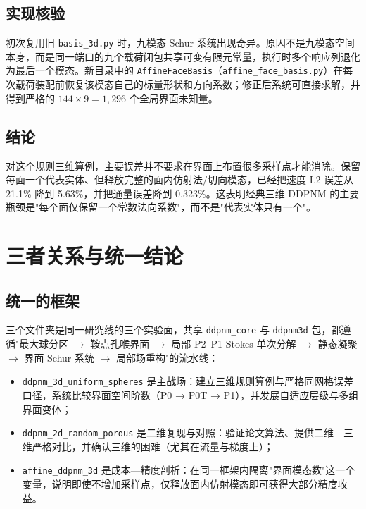 \documentclass[11pt,a4paper]{ctexart}
\newcommand{\Dd}{DDPNM}
\begin{document}
\subsection{实现核验}
\label{sec:affine-validation}

初次复用旧 \texttt{basis\_3d.py} 时，九模态 Schur 系统出现奇异。原因不是九模态空间本身，而是同一端口的九个载荷闭包共享可变有限元常量，执行时多个响应列退化为最后一个模态。新目录中的 \texttt{AffineFaceBasis}（\texttt{affine\_face\_basis.py}）在每次载荷装配前恢复该模态自己的标量形状和方向系数；修正后系统可直接求解，并得到严格的 $144\times9=1{,}296$ 个全局界面未知量。

\subsection{结论}
\label{sec:affine-conclusion}

对这个规则三维算例，主要误差并不要求在界面上布置很多采样点才能消除。保留每面一个代表实体、但释放完整的面内仿射法/切向模态，已经把速度 L2 误差从 21.1\% 降到 5.63\%，并把通量误差降到 0.323\%。这表明经典三维 \Dd{} 的主要瓶颈是"每个面仅保留一个常数法向系数"，而不是"代表实体只有一个"。

\newpage
\section{三者关系与统一结论}
\label{sec:synthesis}

\subsection{统一的框架}
\label{sec:synthesis-framework}

三个文件夹是同一研究线的三个实验面，共享 \texttt{ddpnm\_core} 与 \texttt{ddpnm3d} 包，都遵循"最大球分区 $\to$ 鞍点孔喉界面 $\to$ 局部 P2--P1 Stokes 单次分解 $\to$ 静态凝聚 $\to$ 界面 Schur 系统 $\to$ 局部场重构"的流水线：

\begin{itemize}[itemsep=2pt]
  \item \texttt{ddpnm\_3d\_uniform\_spheres} 是主战场：建立三维规则算例与严格同网格误差口径，系统比较界面空间阶数（P0 → P0T → P1），并发展自适应层级与多组界面变体；
  \item \texttt{ddpnm\_2d\_random\_porous} 是二维复现与对照：验证论文算法、提供二维—三维严格对比，并确认三维的困难（尤其在流量与梯度上）；
  \item \texttt{affine\_ddpnm\_3d} 是成本—精度剖析：在同一框架内隔离"界面模态数"这一个变量，说明即使不增加采样点，仅释放面内仿射模态即可获得大部分精度收益。
\end{itemize}
\end{document}
